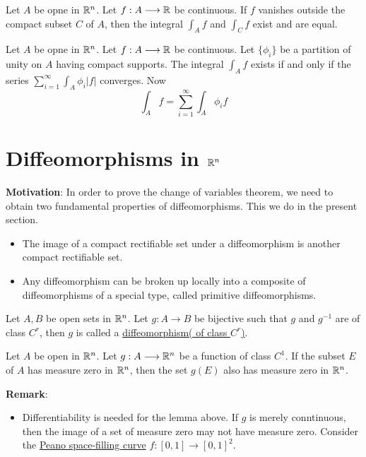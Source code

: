 \begin{lemma}
    Let $A$ be opne in $\mathbb{R}^n$. Let $f:A\longrightarrow\mathbb{R}$ be continuous.
    If $f$ vanishes outside the compact subset $C$ of $A$, then the integral $\int_Af$ and $\int_Cf$ exist and are equal.
\end{lemma}

\begin{theorem}\label{Equivalent definition of extended intrgral 3}
    Let $A$ be opne in $\mathbb{R}^n$. Let $f:A\longrightarrow\mathbb{R}$ be continuous. Let $\{\phi_i\}$ be a partition of unity on $A$ having compact supports. The integral $\int_Af$ exists if and only if the series $\sum_{i=1}^{\infty}\int_A\phi_i|f|$ converges. Now
    $$\int_Af=\sum_{i=1}^{\infty}\int_A\phi_if$$
\end{theorem}

\section{Diffeomorphisms in $\mathbb{R}^n$}

\noindent\textbf{Motivation}:
In order to prove the change of variables theorem, we need to obtain two fundamental properties of diffeomorphisms. This we do in the present section.
\begin{itemize}
    \item The image of a compact rectifiable set under a diffeomorphism is another compact rectifiable set.
    \item Any diffeomorphism can be broken up locally into a composite of diffeomorphisms of a special type, called primitive diffeomorphisms.
\end{itemize}

\begin{definition}
    Let $A,B$ be open sets in $\mathbb{R}^n$. Let $g:A\longrightarrow B$ be bijective such that $g$ and $g^{-1}$ are of class $C^r$, then $g$ is called a \underline{diffeomorphism( of class $C^r$)}.
\end{definition}

\begin{lemma}
    Let $A$ be open in $\mathbb{R}^n$. Let $g:A\longrightarrow \mathbb{R}^n$ be a function of class $C^1$. 
    If the subset $E$ of $A$ has measure zero in $\mathbb{R}^n$, then the set $g(E)$ also has measure zero in $\mathbb{R}^n$.
\end{lemma}

\noindent\textbf{Remark}:
\begin{itemize}
    \item Differentiability is needed for the lemma above. If $g$ is merely conntinuous, then the image of a set of measure zero may not have measure zero. Consider the \underline{Peano space-filling curve} $f:[0,1]\longrightarrow[0,1]^2$.
\end{itemize}

